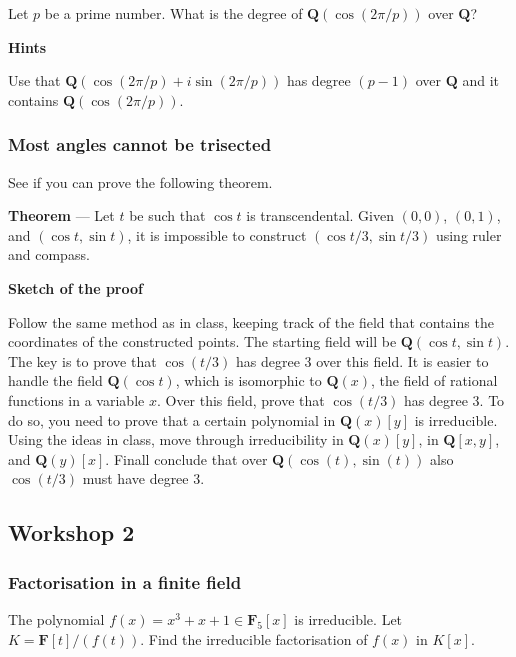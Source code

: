\documentclass[11pt]{article}
\begin{document}
\noindent
Let \(p\) be a prime number.
What is the degree of \(\mathbf{Q}(\cos (2\pi/p))\) over \(\mathbf{Q}\)?

\bigskip

\noindent
\textbf{\textbf{Hints}}

Use that \(\mathbf{Q}(\cos(2\pi/p) + i \sin(2\pi/p))\) has degree \((p-1)\) over \(\mathbf{Q}\) and it contains \(\mathbf{Q}(\cos(2\pi/p))\).
\subsubsection{Most angles cannot be trisected}
\label{sec:orga87f7e0}

See if you can prove the following theorem.

\bigskip

\noindent
\textbf{\textbf{Theorem}} ---
Let \(t\) be such that \(\cos t\) is transcendental.
Given \((0,0)\), \((0,1)\), and \((\cos t, \sin t)\), it is impossible to construct \((\cos t/3, \sin t/3)\) using ruler and compass.

\bigskip

\noindent
\textbf{\textbf{Sketch of the proof}}

Follow the same method as in class, keeping track of the field that contains the coordinates of the constructed points.
The starting field will be \(\mathbf{Q}(\cos t, \sin t)\).
The key is to prove that \(\cos (t/3)\) has degree 3 over this field.
It is easier to handle the field \(\mathbf{Q}(\cos t)\), which is isomorphic to \(\mathbf{Q}(x)\), the field of rational functions in a variable \(x\).
Over this field, prove that \(\cos(t/3)\) has degree 3.
To do so, you need to prove that a certain polynomial in \(\mathbf{Q}(x)[y]\) is irreducible.
Using the ideas in class, move through irreducibility in \(\mathbf{Q}(x)[y]\), in \(\mathbf{Q}[x,y]\), and \(\mathbf{Q}(y)[x]\).
Finall conclude that over \(\mathbf{Q}(\cos(t), \sin(t))\) also \(\cos(t/3)\) must have degree 3.
\subsection{Workshop 2}
\label{sec:org7f48adb}
\subsubsection{Factorisation in a finite field}
\label{sec:orgb64e9cc}

The polynomial \(f(x) = x^3+x+1 \in \mathbf{F}_5[x]\) is irreducible.
Let \(K = \mathbf{F}[t]/(f(t))\).
Find the irreducible factorisation of \(f(x)\) in \(K[x]\).
\end{document}
